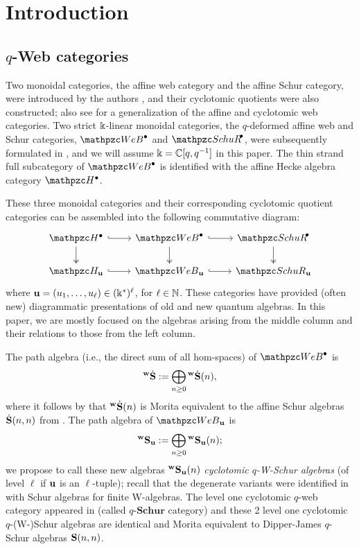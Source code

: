 \section{Introduction}
\label{sec:intr}

\subsection{$q$-Web categories}

Two monoidal categories, the affine web category and the affine Schur category, were introduced by the authors \cite{SW25web, SW24Schur}, and their cyclotomic quotients were also constructed; also see \cite{DKM25} for a generalization of the affine and cyclotomic web categories. Two strict $\Bbbk$-linear monoidal categories, the $q$-deformed affine web and Schur categories, $\qAW$ and $\qASch$, were subsequently formulated in \cite{SSW25}, and we will assume $\Bbbk=\mathbb{C}[q,q^{-1}]$ in this paper. The thin strand full subcategory of $\qAW$ is identified with the affine Hecke algebra category $\qAH$.

These three monoidal categories and their corresponding cyclotomic quotient categories can be assembled into the following commutative diagram:
\begin{equation} \label{CD:categories}
\begin{tikzcd}
\qAH \ar[r,hook]\ar[d,two heads] & \qAW\ar[r,hook]\ar[d,two heads] & \qASch\ar[d,two heads]\\
\qH_\bfu  \ar[r,hook]&\qW_\bfu \ar[r,hook]&\qSch_\bfu
\end{tikzcd} 
\end{equation}
where $\mathbf{u}=(u_1,\ldots, u_\ell) \in (\Bbbk^*)^\ell$, for $\ell \in\mathbb{N}$. These categories have provided (often new) diagrammatic presentations of old and new quantum algebras. In this paper, we are mostly focused on the algebras arising from the middle column and their relations to those from the left column.

The path algebra (i.e., the direct sum of all hom-spaces) of $\qAW$ is 
\[
{}^{\bold{w}}\dot{\bold{S}}:=\bigoplus_{n\ge 0} {}^{\bold{w}}\dot{\bold{S}}(n), 
\]
where it follows by \cite{SSW25} that ${}^{\bold{w}}\dot{\bold{S}}(n)$ is Morita equivalent to the affine Schur algebras $\dot{\bf S}(n,n)$ from \cite{Gre99}.
The path algebra of $\qW_\bfu$ is 
\[
{}^{\bold{w}}\bold{S}_{\mathbf{u}}:=\bigoplus_{n\ge 0} {}^{\bold{w}}\bold{S}_{\mathbf{u}}(n); 
\]
we propose to call these new algebras ${}^{\bold{w}}\bold{S}_{\mathbf{u}}(n)$ {\em cyclotomic $q$-W-Schur algebras} (of level $\ell$ if $\mathbf{u}$ is an $\ell$-tuple); recall that the degenerate variants were identified in \cite{SW25web} with Schur algebras for finite W-algebras. 
The level one cyclotomic $q$-web category appeared in \cite{Bru25} (called $q$-$\mathbf{Schur}$ category) and these 2 level one cyclotomic $q$-(W-)Schur algebras are identical and Morita equivalent to Dipper-James $q$-Schur algebras $\mathbf{S}(n,n)$. 

